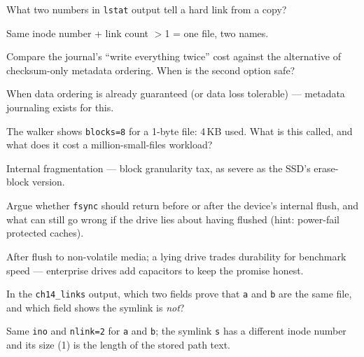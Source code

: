 \begin{exercise}[easy]
What two numbers in \texttt{lstat} output tell a hard link from
a copy?
\end{exercise}
\begin{solution}[hint]
Same inode number + link count $>$1 = one file, two names.
\end{solution}

\begin{exercise}[medium]
Compare the journal's ``write everything twice'' cost against the
alternative of checksum-only metadata ordering. When is the second
option safe?
\end{exercise}
\begin{solution}[hint]
When data ordering is already guaranteed (or data loss tolerable)
--- metadata journaling exists for this.
\end{solution}

\begin{exercise}[medium]
The walker shows \texttt{blocks=8} for a 1-byte file: 4\,KB used.
What is this called, and what does it cost a million-small-files
workload?
\end{exercise}
\begin{solution}[hint]
Internal fragmentation --- block granularity tax, as severe as
the SSD's erase-block version.
\end{solution}

\begin{exercise}[hard]
Argue whether \texttt{fsync} should return before or after the
device's internal flush, and what can still go wrong if the drive
lies about having flushed (hint: power-fail protected caches).
\end{exercise}
\begin{solution}[hint]
After flush to non-volatile media; a lying drive trades
durability for benchmark speed --- enterprise drives add
capacitors to keep the promise honest.
\end{solution}

\begin{exercise}[easy]
In the \texttt{ch14\_links} output, which two fields prove that
\texttt{a} and \texttt{b} are the same file, and which field shows
the symlink is \emph{not}?
\end{exercise}
\begin{solution}[hint]
Same \texttt{ino} and \texttt{nlink=2} for \texttt{a} and \texttt{b};
the symlink \texttt{s} has a different inode number and its size (1) is
the length of the stored path text.
\end{solution}

